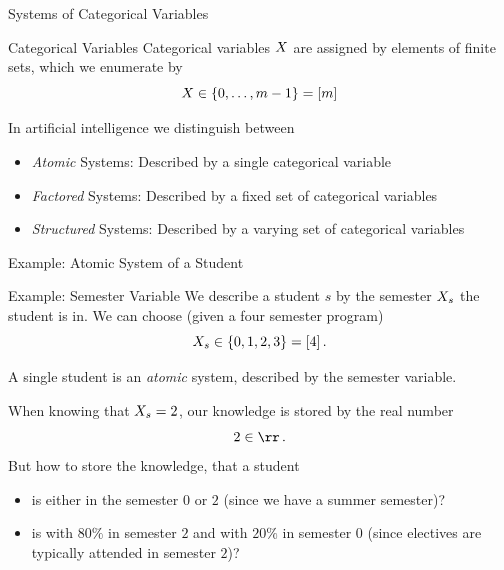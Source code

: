 \documentclass{beamer}
\begin{document}
    \begin{frame}{Systems of Categorical Variables}

        \begin{block}{Categorical Variables}
            Categorical variables $X$ are assigned by elements of finite sets, which we enumerate by
            \[X \in \{0,\ldots,m-1 \} = [m]\]
        \end{block}

        In artificial intelligence we distinguish between
        \begin{itemize}
            \item \emph{Atomic} Systems: Described by a single categorical variable
            \item \emph{Factored} Systems: Described by a fixed set of categorical variables
            \item \emph{Structured} Systems: Described by a varying set of categorical variables
        \end{itemize}

    \end{frame}




    \begin{frame}{Example: Atomic System of a Student}

        \begin{block}{Example: Semester Variable}
            We describe a student $s$ by the semester $X_{s}$ the student is in.
            We can choose (given a four semester program)
            \[ X_{s} \in \{0,1,2,3\} = [4] \, . \]
        \end{block}

        A single student is an \emph{atomic} system, described by the semester variable.

        \medskip

        When knowing that $X_{s}=2$, our knowledge is stored by the real number
        \[ 2 \in \rr \, .\]
        But how to store the knowledge, that a student
        \begin{itemize}
            \item is either in the semester $0$ or $2$ (since we have a summer semester)?
            \item is with $80\%$ in semester $2$ and with $20\%$ in semester $0$ (since electives are typically attended in semester $2$)?
        \end{itemize}

    \end{frame}
\end{document}

